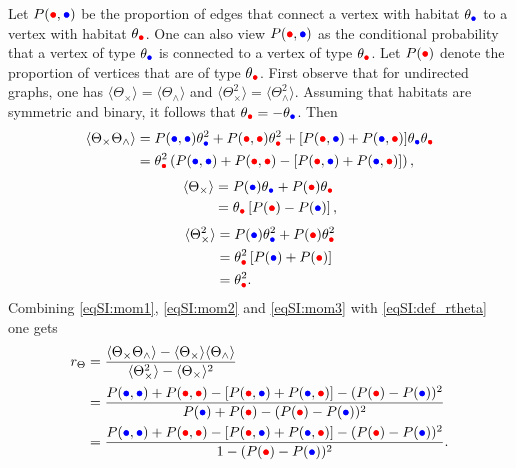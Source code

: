 Let $P(\rcirc,\bcirc)$ be the proportion of edges that connect a vertex with habitat $\theta_{\bcirc}$ to a vertex with habitat $\theta_{\rcirc}$. One can also view $P(\rcirc,\bcirc)$ as the conditional probability that a vertex of type $\theta_{\bcirc}$ is connected to a vertex of type $\theta_{\rcirc}$. Let $P(\rcirc)$ denote the proportion of vertices that are of type $\theta_{\rcirc}$. 
%
First observe that for undirected graphs, one has $ \langle \Theta_\times \rangle  = \langle \Theta_\wedge \rangle$ and $ \langle \Theta_\times^2 \rangle  = \langle \Theta_\wedge^2 \rangle$.
%
Assuming that habitats are symmetric and binary, it follows that $\theta_{\rcirc} = -\theta_{\bcirc}$. Then
\begin{equation}\label{eqSI:mom1}
  \begin{split}
    \langle \Theta_\times\Theta_\wedge \rangle &=P(\bcirc,\bcirc)\theta_{\bcirc}^2 + P(\rcirc,\rcirc)\theta_{\rcirc}^2 + [ P(\rcirc,\bcirc) + P(\bcirc,\rcirc)]\theta_{\bcirc}\theta_{\rcirc}  \\
    &= \theta_{\rcirc}^2 \left( P(\bcirc,\bcirc) + P(\rcirc,\rcirc) -  [ P(\rcirc,\bcirc) + P(\bcirc,\rcirc)] \right) ,
  \end{split}
\end{equation}
\begin{equation}\label{eqSI:mom2}
  \begin{split}
    \langle \Theta_\times \rangle &=  P(\bcirc)\theta_{\bcirc} + P(\rcirc)\theta_{\rcirc}\\
    &= \theta_{\rcirc} \left[ P(\rcirc) - P(\bcirc)\right],
  \end{split}
\end{equation}
\begin{equation}\label{eqSI:mom3}
  \begin{split}
    \langle \Theta_\times^2 \rangle &=  P(\bcirc)\theta_{\bcirc}^2 + P(\rcirc)\theta_{\rcirc}^2\\
    &= \theta_{\rcirc}^2 \left[ P(\bcirc) + P(\rcirc) \right] \\
    &= \theta_{\rcirc}^2 .
  \end{split}
\end{equation}
Combining \cref{eqSI:mom1}, \cref{eqSI:mom2} and \cref{eqSI:mom3} with \cref{eqSI:def_rtheta} one gets
\begin{equation}
  \begin{split}
    r_\Theta
    &= \frac{\langle  \Theta_\times \Theta_\wedge \rangle - \langle  \Theta_\times \rangle \langle  \Theta_\wedge \rangle }{  \langle \Theta_\times^2 \rangle - \langle \Theta_\times \rangle^2}\\
    &= \frac{ P(\bcirc,\bcirc) + P(\rcirc,\rcirc) -  [ P(\rcirc,\bcirc) + P(\bcirc,\rcirc)] - (P(\rcirc) - P(\bcirc))^2}{P(\bcirc) + P(\rcirc) - (P(\rcirc) - P(\bcirc))^2} \\
    &= \frac{ P(\bcirc,\bcirc) + P(\rcirc,\rcirc)  - [ P(\rcirc,\bcirc) + P(\bcirc,\rcirc)] - (P(\rcirc) - P(\bcirc))^2}{1- (P(\rcirc) - P(\bcirc))^2}.
  \end{split}
\end{equation}
